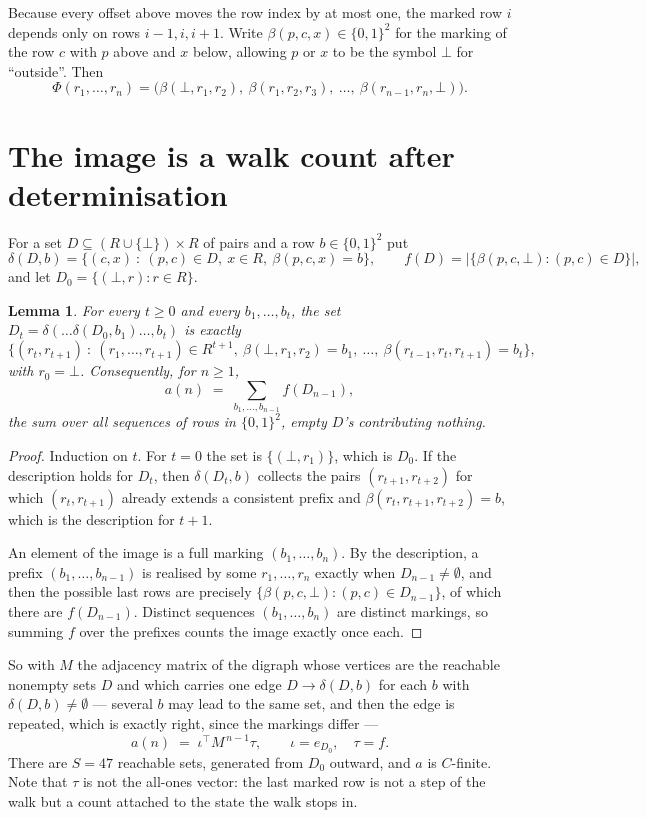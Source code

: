 \documentclass[11pt,a4paper]{article}
\theoremstyle{plain}
\newtheorem{lemma}[theorem]{Lemma}
\theoremstyle{definition}
\begin{document}
Because every offset above moves the row index by at most one, the marked row $i$ depends only
on rows $i-1,i,i+1$. Write $\beta(p,c,x)\in\{0,1\}^{2}$ for the marking of the row $c$
with $p$ above and $x$ below, allowing $p$ or $x$ to be the symbol $\bot$ for ``outside''.
Then
\[
\Phi(r_1,\dots,r_n)=\bigl(\beta(\bot,r_1,r_2),\ \beta(r_1,r_2,r_3),\ \dots,\
\beta(r_{n-1},r_n,\bot)\bigr).
\]

\section{The image is a walk count after determinisation}

For a set $D\subseteq(R\cup\{\bot\})\times R$ of pairs and a row $b\in\{0,1\}^{2}$ put
\[
\delta(D,b)=\{(c,x)\ :\ (p,c)\in D,\ x\in R,\ \beta(p,c,x)=b\},\qquad
f(D)=\bigl|\{\beta(p,c,\bot):(p,c)\in D\}\bigr| ,
\]
and let $D_0=\{(\bot,r):r\in R\}$.

\begin{lemma}\label{lem:det}
For every $t\ge0$ and every $b_1,\dots,b_t$, the set
$D_t=\delta(\dots\delta(D_0,b_1)\dots,b_t)$ is exactly
\[
\{(r_t,r_{t+1})\ :\ (r_1,\dots,r_{t+1})\in R^{t+1},\ \beta(\bot,r_1,r_2)=b_1,\ \dots,\
\beta(r_{t-1},r_t,r_{t+1})=b_t\} ,
\]
with $r_0=\bot$. Consequently, for $n\ge1$,
\[
a(n)\;=\;\sum_{b_1,\dots,b_{n-1}}f(D_{n-1}),
\]
the sum over all sequences of rows in $\{0,1\}^{2}$, empty $D$'s contributing nothing.
\end{lemma}

\begin{proof}
Induction on $t$. For $t=0$ the set is $\{(\bot,r_1)\}$, which is $D_0$. If the description
holds for $D_t$, then $\delta(D_t,b)$ collects the pairs $(r_{t+1},r_{t+2})$ for which
$(r_t,r_{t+1})$ already extends a consistent prefix and
$\beta(r_t,r_{t+1},r_{t+2})=b$, which is the description for $t+1$.

An element of the image is a full marking $(b_1,\dots,b_n)$. By the description, a prefix
$(b_1,\dots,b_{n-1})$ is realised by some $r_1,\dots,r_n$ exactly when $D_{n-1}\neq
\emptyset$, and then the possible last rows are precisely
$\{\beta(p,c,\bot):(p,c)\in D_{n-1}\}$, of which there are $f(D_{n-1})$. Distinct
sequences $(b_1,\dots,b_n)$ are distinct markings, so summing $f$ over the prefixes counts the
image exactly once each.
\end{proof}

So with $M$ the adjacency matrix of the digraph whose vertices are the reachable nonempty sets
$D$ and which carries one edge $D\to\delta(D,b)$ for each $b$ with $\delta(D,b)\neq\emptyset$
--- several $b$ may lead to the same set, and then the edge is repeated, which is exactly
right, since the markings differ ---
\[
a(n)\;=\;\iota^{\!\top}M^{\,n-1}\tau,\qquad \iota=e_{D_0},\quad \tau=f .
\]
There are $S=47$ reachable sets, generated from $D_0$ outward, and $a$ is $C$-finite. Note
that $\tau$ is not the all-ones vector: the last marked row is not a step of the walk but a
count attached to the state the walk stops in.
\end{document}
